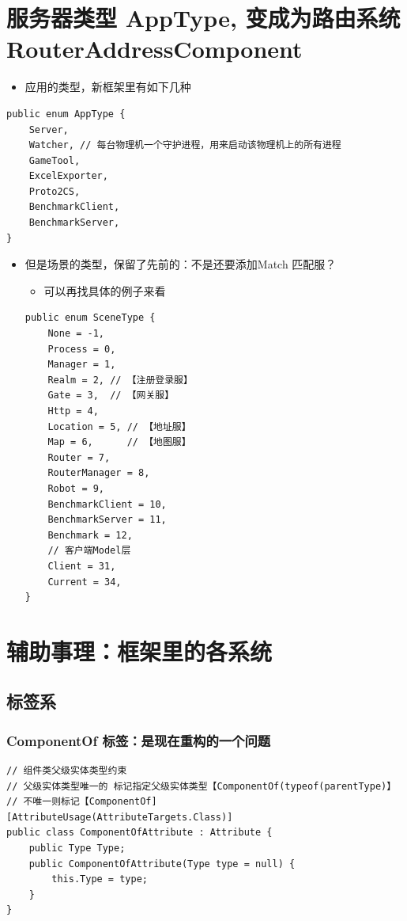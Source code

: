 \documentclass[9pt, b5paper]{article}
\begin{document}
\section{服务器类型 AppType, 变成为路由系统 RouterAddressComponent}
\label{sec-3}
\begin{itemize}
\item 应用的类型，新框架里有如下几种
\end{itemize}
\begin{verbatim}
public enum AppType {
    Server,
    Watcher, // 每台物理机一个守护进程，用来启动该物理机上的所有进程
    GameTool,
    ExcelExporter,
    Proto2CS,
    BenchmarkClient,
    BenchmarkServer,
}
\end{verbatim}
\begin{itemize}
\item 但是场景的类型，保留了先前的：不是还要添加Match 匹配服？
\begin{itemize}
\item 可以再找具体的例子来看
\end{itemize}
\begin{verbatim}
public enum SceneType {
    None = -1,
    Process = 0,
    Manager = 1,
    Realm = 2, // 【注册登录服】
    Gate = 3,  // 【网关服】
    Http = 4,
    Location = 5, // 【地址服】
    Map = 6,      // 【地图服】
    Router = 7,
    RouterManager = 8,
    Robot = 9,
    BenchmarkClient = 10,
    BenchmarkServer = 11,
    Benchmark = 12,
    // 客户端Model层
    Client = 31,
    Current = 34,
}
\end{verbatim}
\end{itemize}
\section{辅助事理：框架里的各系统}
\label{sec-4}
\subsection{标签系}
\label{sec-4-1}
\subsubsection{ComponentOf 标签：是现在重构的一个问题}
\label{sec-4-1-1}
\begin{verbatim}
// 组件类父级实体类型约束
// 父级实体类型唯一的 标记指定父级实体类型【ComponentOf(typeof(parentType)】
// 不唯一则标记【ComponentOf]
[AttributeUsage(AttributeTargets.Class)]
public class ComponentOfAttribute : Attribute {
    public Type Type;
    public ComponentOfAttribute(Type type = null) {
        this.Type = type;
    }
}
\end{verbatim}
\end{document}
